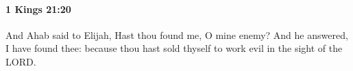 
		\paragraph{1 Kings 21:20} %
			\label{1KINGS-21-20}

			And Ahab said to Elijah, Hast thou found me, O mine enemy? And he answered, I have found thee: because thou hast sold thyself to work evil in the sight of the LORD.


